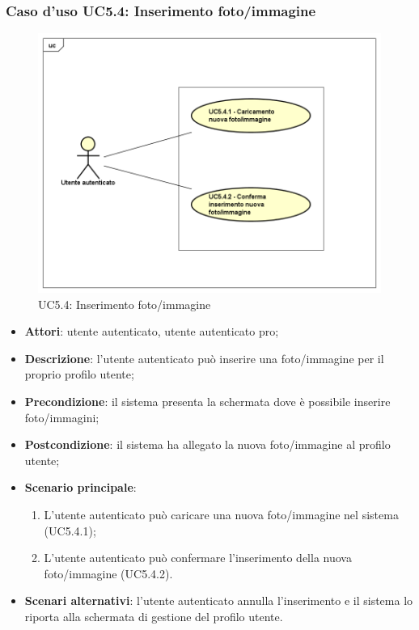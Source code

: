 \subsubsection{Caso d'uso UC5.4: Inserimento foto/immagine}
\label{UC5.4}
\begin{figure}[h]
	\centering
	\includegraphics[scale=0.5,keepaspectratio]{UML/UC5_4.png}
	\caption{UC5.4: Inserimento foto/immagine}
\end{figure}
\begin{itemize}
	\item \textbf{Attori}: utente autenticato, utente autenticato pro;
	\item \textbf{Descrizione}: l'utente autenticato può inserire una foto/immagine per il proprio profilo utente;
	\item \textbf{Precondizione}: il sistema presenta la schermata dove è possibile inserire foto/immagini;
	\item \textbf{Postcondizione}: il sistema ha allegato la nuova foto/immagine al profilo utente;
	\item \textbf{Scenario principale}:
	\begin{enumerate}
		\item L'utente autenticato può caricare una nuova foto/immagine nel sistema (UC5.4.1);
		\item L'utente autenticato può confermare l'inserimento della nuova foto/immagine (UC5.4.2).
	\end{enumerate}
	\item \textbf{Scenari alternativi}: l'utente autenticato annulla l'inserimento e il sistema lo riporta alla schermata di gestione del profilo utente.
\end{itemize}

